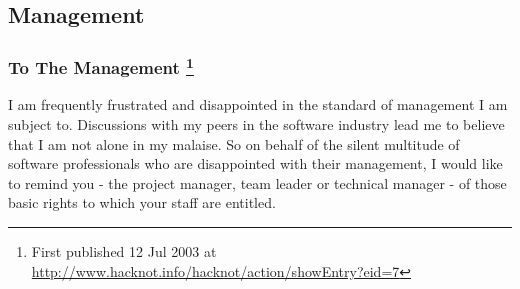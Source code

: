\documentclass{article}
\begin{document}
\subsection{Management}
\label{sec:orgheadline189}

\subsubsection{To The Management  \footnote{First published 12 Jul 2003 at
\url{http://www.hacknot.info/hacknot/action/showEntry?eid=7}}}
\label{sec:orgheadline142}

I am frequently frustrated and disappointed in the standard of
management I am subject to. Discussions with my peers in the software
industry lead me to believe that I am not alone in my malaise. So on
behalf of the silent multitude of software professionals who are
disappointed with their management, I would like to remind you - the
project manager, team leader or technical manager - of those basic
rights to which your staff are entitled.
\end{document}
